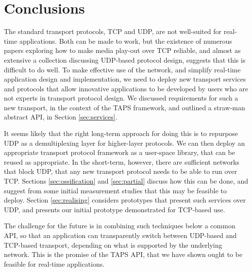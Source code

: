\documentclass[10pt]{sig-alternate-05-2015}
\begin{document}
\section{Conclusions}
\label{sec:conclusions}

The standard transport protocols, TCP and UDP, are not well-suited for
real-time applications. Both can be made to work, but the existence of
numerous papers exploring how to make media play-out over TCP reliable,
and almost as extensive a collection discussing UDP-based protocol design,
suggests that this is difficult to do well. To make effective use of the
network, and simplify real-time application design and implementation, we
need to deploy new transport services and protocols that allow innovative
applications to be developed by users who are not experts in transport 
protocol design. We discussed requirements for such a new transport, in
the context of the TAPS framework, and outlined a straw-man abstract API,
in Section \ref{sec:services}.

It seems likely that the right long-term approach for doing this is to
repurpose UDP as a demultiplexing layer for higher-layer protocols. We can
then deploy an appropriate transport protocol framework as a user-space
library, that can be reused as appropriate. In the short-term, however, 
there are sufficient networks that block UDP, that any new transport
protocol needs to be able to run over TCP. Sections \ref{sec:ossification}
and \ref{sec:partial} discuss how this can be done, and suggest from some
initial measurement studies that this may be feasible to deploy. Section
\ref{sec:realising} considers prototypes that present such services over
UDP, and presents our initial prototype demonstrated for TCP-based use.

The challenge for the future is in combining such techniques below a common
API, so that an application can transparently switch between UDP-based and
TCP-based transport, depending on what is supported by the underlying
network. This is the promise of the TAPS API, that we have shown ought to
be feasible for real-time applications.


%
%
\balance


\end{document}
